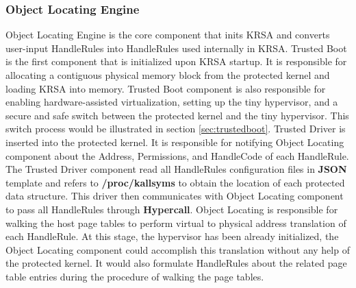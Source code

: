 \documentclass[conference]{IEEEtran}
\begin{document}
\subsubsection{Object Locating Engine}\label{sec:oledesign}
Object Locating Engine is the core component that inits KRSA and converts user-input HandleRules into HandleRules used internally in KRSA. 
Trusted Boot is the first component that is initialized upon KRSA startup. It is responsible for allocating a contiguous physical memory block from the protected kernel and loading KRSA into memory. Trusted Boot component is also responsible for enabling hardware-assisted virtualization, setting up the tiny hypervisor, and a secure and safe switch between the protected kernel and the tiny hypervisor. This switch process would be illustrated in section \ref{sec:trustedboot}.
Trusted Driver is inserted into the protected kernel. It is responsible for notifying Object Locating component about the Address, Permissions, and HandleCode of each HandleRule. The Trusted Driver component read all HandleRules configuration files in \textbf{JSON} template and refers to \textbf{/proc/kallsyms} to obtain the location of each protected data structure. This driver then communicates with Object Locating component to pass all HandleRules through \textbf{Hypercall}.
Object Locating is responsible for walking the host page tables to perform virtual to physical address translation of each HandleRule. At this stage, the hypervisor has been already initialized, the Object Locating component could accomplish this translation without any help of the protected kernel. 
It would also formulate HandleRules about the related page table entries during the procedure of walking the page tables.
\end{document}
